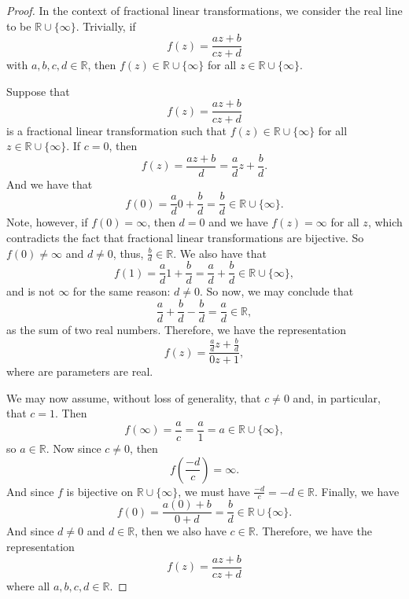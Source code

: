 \documentclass[12pt]{article}
\newcommand{\R}{\mathbb{R}} %
\newcommand{\<}{\left\langle} %
\renewcommand{\>}{\right\rangle} %
\begin{document}
\begin{proof}
    In the context of fractional linear transformations, we consider the real line to be $\R\cup\{\infty\}$. Trivially, if
    \[f(z) = \frac{az + b}{cz+d}\]
    with $a,b,c,d\in\R$, then $f(z)\in\R\cup\{\infty\}$ for all $z\in\R\cup\{\infty\}$.
    
    Suppose that
    \[f(z) = \frac{az + b}{cz + d}\]
    is a fractional linear transformation such that $f(z)\in\R\cup\{\infty\}$ for all $z\in\R\cup\{\infty\}$. If $c=0$, then
    \[f(z) = \frac{az + b}{d} = \frac{a}{d}z + \frac{b}{d}.\]
    And we have that
    \[f(0) = \frac{a}{d}0 + \frac{b}{d} = \frac{b}{d} \in \R\cup\{\infty\}.\]
    Note, however, if $f(0) = \infty$, then $d=0$ and we have $f(z)=\infty$ for all $z$, which contradicts the fact that fractional linear transformations are bijective. So $f(0)\ne\infty$ and $d\ne0$, thus, $\frac{b}{d}\in\R$. We also have that
    \[f(1) = \frac{a}{d}1 + \frac{b}{d} = \frac{a}{d} + \frac{b}{d} \in\R\cup\{\infty\},\]
    and is not $\infty$ for the same reason: $d\ne 0$. So now, we may conclude that
    \[\frac{a}{d} + \frac{b}{d} - \frac{b}{d} = \frac{a}{d} \in\R,\]
    as the sum of two real numbers. Therefore, we have the representation
    \[f(z) = \frac{\frac{a}{d}z + \frac{b}{d}}{0z + 1},\]
    where are parameters are real.
    
    We may now assume, without loss of generality, that $c\ne0$ and, in particular, that $c=1$. Then
    \[f(\infty) = \frac{a}{c} = \frac{a}{1} = a \in\R\cup\{\infty\},\]
    so $a\in\R$. Now since $c\ne 0$, then
    \[f\left(\frac{-d}{c}\right) = \infty.\]
    And since $f$ is bijective on $\R\cup\{\infty\}$, we must have $\frac{-d}{c} = -d \in\R$. Finally, we have
    \[f(0) = \frac{a(0) + b}{0 + d} = \frac{b}{d} \in \R\cup\{\infty\}.\]
    And since $d\ne0$ and $d\in\R$, then we also have $c\in\R$. Therefore, we have the representation
    \[f(z) = \frac{az + b}{cz + d}\]
    where all $a,b,c,d\in\R$.
    
\end{proof}
\end{document}
